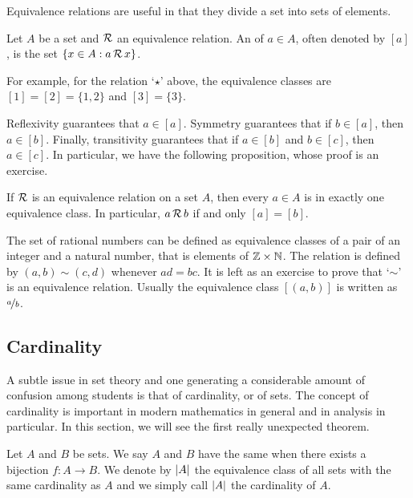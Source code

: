 Equivalence relations are useful in that they divide a set into sets of
 elements.

\begin{defn}
Let $A$ be a set and ${\mathcal{R}}$ an equivalence relation.
An \emph{} of $a \in A$, often denoted
by $[a]$, is the set $\{ x \in A : a\, {\mathcal{R}} \, x \}$.
\end{defn}

For example, for the relation `$\star$' above, the equivalence classes
are $[1] = [2] = \{ 1,2 \}$ and $[3] = \{ 3 \}$.

Reflexivity guarantees that $a \in [a]$.  Symmetry guarantees
that if $b \in [a]$, then $a \in [b]$.  Finally, transitivity guarantees that
if $a \in [b]$ and $b \in [c]$, then $a \in [c]$.
In particular, we have the following proposition, whose proof is an
exercise.

\begin{prop} \label{prop:equivclasses}
If ${\mathcal{R}}$ is an equivalence relation on a set $A$,
then every $a \in A$ is in exactly one
equivalence class.  In particular, $a\, {\mathcal{R}} \, b$ if and only $[a] = [b]$.
\end{prop}

\begin{example} \label{example:ratnums}
The set of rational numbers can be defined as equivalence classes of
a pair of an integer and a natural number,
that is elements of ${\mathbb{Z}} \times {\mathbb{N}}$.  The relation
is defined by $(a,b) \sim (c,d)$ whenever $ad = bc$.
It is left as an exercise to prove that `$\sim$' is an equivalence relation.
Usually the equivalence class $[(a,b)]$ is written as $\nicefrac{a}{b}$.
\end{example}

\subsection{Cardinality}

A subtle issue in set theory and one generating a considerable amount of
confusion among students is that of cardinality, or  of sets.  The
concept of cardinality is important in modern mathematics in general and
in analysis in particular.  In this section, we will see the first really
unexpected theorem.

\begin{defn}
Let $A$ and $B$ be sets.  We say $A$ and $B$ have the same
\emph{}
when there exists a bijection $f \colon A \to B$.  We denote
by $\left\lvert {A} \right\rvert$  the equivalence class of all sets with the same cardinality as
$A$ and we simply call $\left\lvert {A} \right\rvert$ the cardinality of $A$.
\end{defn}

